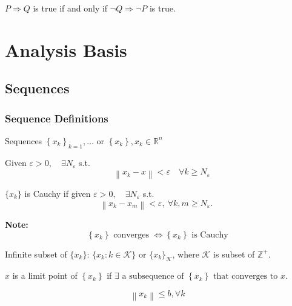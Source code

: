 \documentclass[11pt]{elegantbook}
\begin{document}
\begin{theorem}
\normalfont
$P \Rightarrow Q$ is true if and only if $\lnot Q \Rightarrow \lnot P$ is true.
\end{theorem}



\chapter{Analysis Basis}
\section{Sequences}
\subsection{Sequence Definitions}
Sequences $\left\{x_{k}\right\}_{k=1}, \ldots$ or $\left\{x_{k}\right\}, x_{k} \in \mathbb{R}^{n}$
\begin{definition}[Convergence: note $x_{k} \rightarrow x, \lim _{k \rightarrow \infty} x_{k}=x$]
    Given $\varepsilon>0, \quad \exists N_{\varepsilon}$ s.t. $$\quad\left\|x_{k}-x\right\|<\varepsilon \quad \forall k \geqslant N_{\varepsilon}$$
\end{definition}

\begin{definition}
    $\{x_k\}$ is Cauchy if given $\varepsilon>0, \quad \exists N_{\varepsilon}$ s.t.
    $$\left\|x_{k}-x_{m}\right\|<\varepsilon,\  \forall k, m \geqslant N_{\varepsilon} \text {. }$$
\end{definition}
\textbf{Note:}$$\left\{x_{k}\right\} \text { converges } \Longleftrightarrow\left\{x_{k}\right\} \text { is Cauchy}$$


\begin{definition}[Subsequence]
Infinite subset of $\{x_k\}$: $\{x_k:k\in \mathcal{K} \}\text{ or } \{x_k\}_\mathcal{K} $, where $\mathcal{K} $ is subset of $\mathbb{Z}^+$.
\end{definition}

\begin{definition}
$x$ is a limit point of $\left\{x_{k}\right\}$ if $\exists \text { a subsequence of }\left\{x_{k}\right\} \text { that converges to } x$.
\end{definition}

\begin{definition}
    $$\left\|x_{k}\right\| \leqslant b, \forall k$$
\end{definition}
\end{document}
